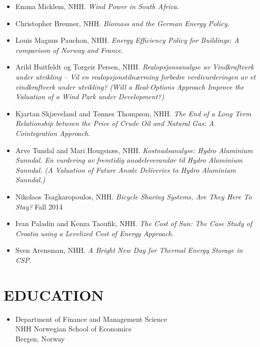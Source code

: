 \documentclass[margin]{res}
\begin{document}
\begin{resume}
\begin{itemize}
\begin{itemize}
  \item[] Emma Micklem, NHH. \emph{Wind Power in South Africa.}
  \item[] Christopher Brenner, NHH. \emph{Biomass and the German Energy Policy.}
  \item[] Louis Magnus Pauchon, NHH. \emph{Energy Efficiency Policy for Buildings: A comparison of Norway and France.}
  \item[] Arild Huitfeldt og Torgeir Persen, NHH.  \emph{Realopsjonsanalyse av Vindkraftverk under utvikling – Vil en realopsjonstiln\ae rming forbedre verdivurderingen av et vindkraftverk under utvikling? (Will a Real-Options Approach Improve the Valuation of a Wind Park under Development?)}
  \item[] Kjartan Skj\ae veland and T\o nnes Thompson, NHH. \emph{The End of a Long Term Relationship between the Price of Crude Oil and Natural Gas: A Cointegration Approach.} 
  \item[] Arve Tundal and Mari Hougsn\ae s, NHH.  \emph{Kostnadsanalyse: Hydro Aluminium Sunndal.  En vurdering av fremtidig anodeleverand\o r til Hydro Aluminium Sunndal. (A Valuation of Future Anode Deliveries to Hydro Aluminium Sunndal.)} 
  \item[] Nikolaos Tsagkaropoulos, NHH. \emph{Bicycle Sharing Systems, Are They Here To Stay?} Fall 2014
  \item[] Ivan Paladin and Kenza Taoufik, NHH. \emph{The Cost of Sun: The Case Study of Croatia using a Levelized Cost of Energy Approach.}
  \item[] Sven Arensman, NHH. \emph{A Bright New Day for Thermal Energy Storage in CSP.}
  \end{itemize}
\end{itemize}

\section{EDUCATION}      
 
\begin{itemize}
\normalsize{\section{Ph.D. Business Economics \\ August 2008 - May 2012}} 
\item[] Department of Finance and Management Science\\
NHH Norwegian School of Economics \\
Bergen, Norway \\   


\end{itemize}
\end{resume}
\end{document}
